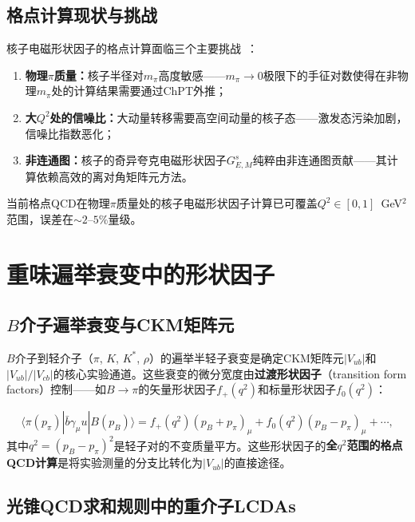 \documentclass[12pt,a4paper]{ctexart}
\theoremstyle{definition}
\begin{document}
\subsection{格点计算现状与挑战}

核子电磁形状因子的格点计算面临三个主要挑战~\cite{GattringerLang2010}：

\begin{enumerate}[nosep]
    \item \textbf{物理$\pi$质量：}核子半径对$m_\pi$高度敏感——$m_\pi \to 0$极限下的手征对数使得在非物理$m_\pi$处的计算结果需要通过ChPT外推；
    \item \textbf{大$Q^2$处的信噪比：}大动量转移需要高空间动量的核子态——激发态污染加剧，信噪比指数恶化；
    \item \textbf{非连通图：}核子的奇异夸克电磁形状因子$G_{E,M}^s$纯粹由非连通图贡献——其计算依赖高效的离对角矩阵元方法。
\end{enumerate}

当前格点QCD在物理$\pi$质量处的核子电磁形状因子计算已可覆盖$Q^2 \in [0, 1]$~GeV$^2$范围，误差在$\sim 2\text{--}5\%$量级。

\section{重味遍举衰变中的形状因子}

\subsection{$B$介子遍举衰变与CKM矩阵元}

$B$介子到轻介子（$\pi$, $K$, $K^*$, $\rho$）的遍举半轻子衰变是确定CKM矩阵元$|V_{ub}|$和$|V_{ub}|/|V_{cb}|$的核心实验通道。这些衰变的微分宽度由\textbf{过渡形状因子}（transition form factors）控制——如$B \to \pi$的矢量形状因子$f_+(q^2)$和标量形状因子$f_0(q^2)$：

\begin{equation}
\langle \pi(p_\pi) | \bar b \gamma_\mu u | B(p_B) \rangle = f_+(q^2)(p_B + p_\pi)_\mu + f_0(q^2)(p_B - p_\pi)_\mu + \cdots,
\label{eq:B_to_pi_FF}
\end{equation}
其中$q^2 = (p_B - p_\pi)^2$是轻子对的不变质量平方。这些形状因子的\textbf{全$q^2$范围的格点QCD计算}是将实验测量的分支比转化为$|V_{ub}|$的直接途径。

\subsection{光锥QCD求和规则中的重介子LCDAs}
\end{document}
